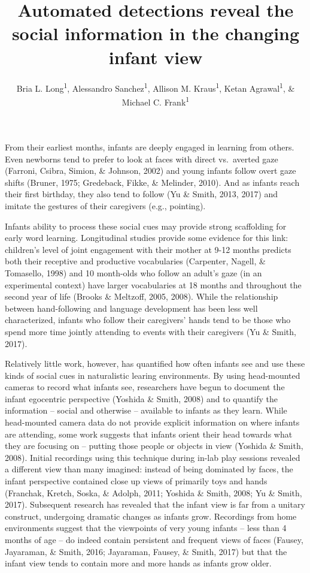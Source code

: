 \documentclass[english,man]{apa6}
\author{Bria L. Long\textsuperscript{1}, Alessandro Sanchez\textsuperscript{1}, Allison M. Kraus\textsuperscript{1}, Ketan Agrawal\textsuperscript{1}, \& Michael C. Frank\textsuperscript{1}}
\affiliation{
\vspace{0.5cm}
\textsuperscript{1} Department of Psychology, Stanford University}
\title{Automated detections reveal the social information in the changing
infant view}
\date{}
\begin{document}
\maketitle

From their earliest months, infants are deeply engaged in learning from
others. Even newborns tend to prefer to look at faces with direct
vs.~averted gaze (Farroni, Csibra, Simion, \& Johnson, 2002) and young
infants follow overt gaze shifts (Bruner, 1975; Gredeback, Fikke, \&
Melinder, 2010). And as infants reach their first birthday, they also
tend to follow (Yu \& Smith, 2013, 2017) and imitate the gestures of
their caregivers (e.g., pointing).

Infants ability to process these social cues may provide strong
scaffolding for early word learning. Longitudinal studies provide some
evidence for this link: children's level of joint engagement with their
mother at 9-12 months predicts both their receptive and productive
vocabularies (Carpenter, Nagell, \& Tomasello, 1998) and 10 month-olds
who follow an adult's gaze (in an experimental context) have larger
vocabularies at 18 months and throughout the second year of life (Brooks
\& Meltzoff, 2005, 2008). While the relationship between hand-following
and language development has been less well characterized, infants who
follow their caregivers' hands tend to be those who spend more time
jointly attending to events with their caregivers (Yu \& Smith, 2017).

Relatively little work, however, has quantified how often infants see
and use these kinds of social cues in naturalistic learing environments.
By using head-mounted cameras to record what infants see, researchers
have begun to document the infant egocentric perspective (Yoshida \&
Smith, 2008) and to quantify the information -- social and otherwise --
available to infants as they learn. While head-mounted camera data do
not provide explicit information on where infants are attending, some
work suggests that infants orient their head towards what they are
focusing on -- putting those people or objects in view (Yoshida \&
Smith, 2008). Initial recordings using this technique during in-lab play
sessions revealed a different view than many imagined: instead of being
dominated by faces, the infant perspective contained close up views of
primarily toys and hands (Franchak, Kretch, Soska, \& Adolph, 2011;
Yoshida \& Smith, 2008; Yu \& Smith, 2017). Subsequent research has
revealed that the infant view is far from a unitary construct,
undergoing dramatic changes as infants grow. Recordings from home
environments suggest that the viewpoints of very young infants -- less
than 4 months of age -- do indeed contain persistent and frequent views
of faces (Fausey, Jayaraman, \& Smith, 2016; Jayaraman, Fausey, \&
Smith, 2017) but that the infant view tends to contain more and more
hands as infants grow older.
\end{document}
